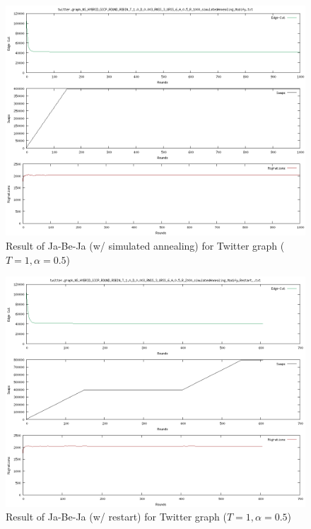 \documentclass[]{article}
\begin{document}
\begin{figure}[!h]
    \centering
    \includegraphics[width=.5\textwidth]{../task2/twitter.graph_NS_HYBRID_GICP_ROUND_ROBIN_T_1.0_D_0.003_RNSS_3_URSS_6_A_0.5_R_1000_simulatedAnnealing_Modify.txt.png}
    \caption{Result of Ja-Be-Ja (w/ simulated annealing) for Twitter graph ($T=1, \alpha=0.5$)}
\end{figure}


\begin{figure}[!h]
    \centering
    \includegraphics[width=.5\textwidth]{../task2/twitter.graph_NS_HYBRID_GICP_ROUND_ROBIN_T_1.0_D_0.003_RNSS_3_URSS_6_A_0.5_R_2000_simulatedAnnealing_Modify_Restart_.txt.png}
    \caption{Result of Ja-Be-Ja (w/ restart) for Twitter graph ($T=1, \alpha=0.5$)}
\end{figure}
\end{document}
